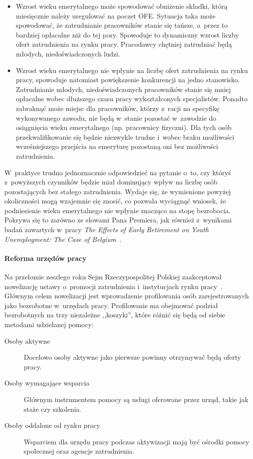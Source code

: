 \documentclass[12pt]{article}
\begin{document}
    \begin{itemize}
        \item Wzrost wieku emerytalnego może spowodować obniżenie składki, którą miesięcznie należy uregulować na poczet OFE. Sytuacja taka może spowodować, że zatrudnianie pracowników stanie się tańsze, a~przez to bardziej opłacalne niż do tej pory. Spowoduje to dynamiczny wzrost liczby ofert zatrudnienia na rynku pracy. Pracodawcy chętniej zatrudniać będą młodych, niedoświadczonych ludzi.
        \item Wzrost wieku emerytalnego nie wpłynie na liczbę ofert zatrudnienia na rynku pracy, spowoduje natomiast powiększenie konkurencji na jedno stanowisko. Zatrudnianie młodych, niedoświadczonych pracowników stanie się mniej opłacalne wobec dłuższego czasu pracy wykształconych specjalistów. Ponadto zabraknąć może miejsc dla pracowników, którzy z~racji na specyfikę wykonywanego zawodu, nie będą w~stanie pozostać w~zawodzie do osiągnięcia wieku emerytalnego (np. pracownicy fizyczni). Dla tych osób przekwalifikowanie się będzie niezwykle trudne i~wobec braku możliwości wcześniejszego przejścia na emeryturę pozostaną oni bez możliwości zatrudnienia. 
    \end{itemize}
 
    W~praktyce trudno jednoznacznie odpowiedzieć na pytanie o~to, czy któryś z~powyższych czynników będzie miał dominujący wpływ na liczbę osób pozostających bez stałego zatrudnienia. Wydaje się, że wymienione powyżej okoliczności mogą wzajemnie się znosić, co pozwala wyciągnąć wniosek, że podniesienie wieku emerytalnego nie wpłynie znacząco na stopę bezrobocia. Pokrywa się to zarówno ze słowami Pana Premiera, jak również z~wynikami badań zawartych w~pracy \emph{The Effects of Early Retirement on Youth Unemployment: The Case of Belgium}~\cite{imf}.
    
    \paragraph{Reforma urzędów pracy}
    
    Na przełomie zeszłego roku Sejm Rzeczypospolitej Polskiej zaakceptował nowelizację ustawy o~promocji zatrudnienia i~instytucjach rynku pracy~\cite{dz:u}. Głównym celem nowelizacji jest wprowadzenie profilowania osób zarejestrowanych jako bezrobotne w~urzędach pracy. Profilowanie ma obejmować podział bezrobotnych na trzy niezależne ,,koszyki'', które różnić się będą od siebie metodami udzielanej pomocy:
    
    \begin{description}
        \item[Osoby aktywne] Docelowo osoby aktywne jako pierwsze powinny otrzymywać będą oferty pracy. 
        \item[Osoby wymagające wsparcia] Głównym instrumentem pomocy są usługi oferowane przez urząd, takie jak staże czy szkolenia.
        \item[Osoby oddalone od rynku pracy] Wsparciem dla urzędu pracy podczas aktywizacji mają być ośrodki pomocy społecznej oraz agencje zatrudnienia.
    \end{description}
\end{document}
